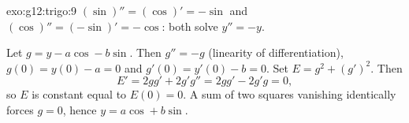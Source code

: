 \begin{solution}{exo:g12:trigo:9}
$(\sin)'' = (\cos)' = -\sin$ and $(\cos)'' = (-\sin)' = -\cos$: both solve
$y'' = -y$.

Let $g = y - a\cos - b\sin$. Then $g'' = -g$ (linearity of differentiation),
$g(0) = y(0) - a = 0$ and $g'(0) = y'(0) - b = 0$. Set
$E = g^2 + (g')^2$. Then
\[
E' = 2g g' + 2g' g'' = 2g g' - 2g' g = 0,
\]
so $E$ is constant equal to $E(0) = 0$. A sum of two squares vanishing
identically forces $g = 0$, hence $y = a\cos + b\sin$.
\end{solution}
